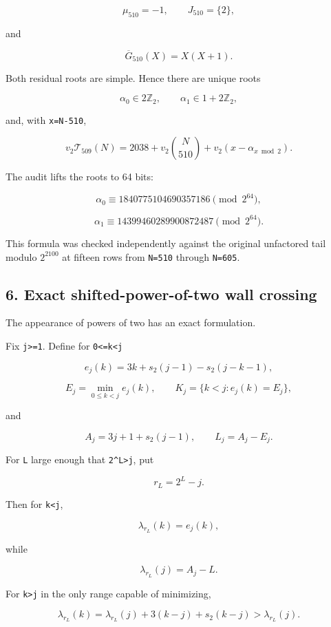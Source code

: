 \documentclass[11pt,letterpaper]{article}
\begin{document}
\[
\mu_{510}=-1,
\qquad J_{510}=\{2\},
\]

and

\[
\overline G_{510}(X)=X(X+1).
\]

Both residual roots are simple. Hence there are unique roots

\[
\alpha_0\in2\mathbb Z_2,
\qquad
\alpha_1\in1+2\mathbb Z_2,
\]

and, with \texttt{x=N-510},

\[
\boxed{
 v_2\mathcal T_{509}(N)
 =2038+v_2\binom N{510}
 +v_2(x-\alpha_{x\bmod2}).
}
\]

The audit lifts the roots to 64 bits:

\[
\alpha_0\equiv
1840775104690357186
\pmod{2^{64}},
\]

\[
\alpha_1\equiv
14399460289900872487
\pmod{2^{64}}.
\]

This formula was checked independently against the original unfactored tail modulo \(2^{2100}\) at fifteen rows from \texttt{N=510} through \texttt{N=605}.

\subsection{6. Exact shifted-power-of-two wall crossing}\label{exact-shifted-power-of-two-wall-crossing}

The appearance of powers of two has an exact formulation.

Fix \texttt{j\textgreater{}=1}. Define for \texttt{0\textless{}=k\textless{}j}

\[
e_j(k)
=3k+s_2(j-1)-s_2(j-k-1),
\]

\[
E_j=\min_{0\le k<j}e_j(k),
\qquad
K_j=\{k<j:e_j(k)=E_j\},
\]

and

\[
A_j=3j+1+s_2(j-1),
\qquad
L_j=A_j-E_j.
\]

For \texttt{L} large enough that \texttt{2\^{}L\textgreater{}j}, put

\[
r_L=2^L-j.
\]

Then for \texttt{k\textless{}j},

\[
\lambda_{r_L}(k)=e_j(k),
\]

while

\[
\lambda_{r_L}(j)=A_j-L.
\]

For \texttt{k\textgreater{}j} in the only range capable of minimizing,

\[
\lambda_{r_L}(k)
=\lambda_{r_L}(j)+3(k-j)+s_2(k-j)
>\lambda_{r_L}(j).
\]
\end{document}

